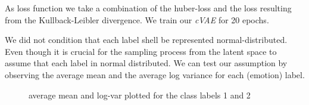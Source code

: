 \documentclass{article}
\begin{document}
As loss function we take a combination of the huber-loss and the loss resulting from the Kullback-Leibler divergence. We train our \textit{cVAE} for 20 epochs.

We did not condition that each label shell be represented normal-distributed. Even though it is crucial for the sampling process from the latent space to assume that each label in normal distributed. We can test our assumption by observing the average mean and the average log variance for each (emotion) label.

\begin{figure}[ht!]
    \hfill
    \hfill
    \caption{average mean and log-var plotted for the class labels 1 and 2}
    \label{fig:means}
\end{figure}
\end{document}
